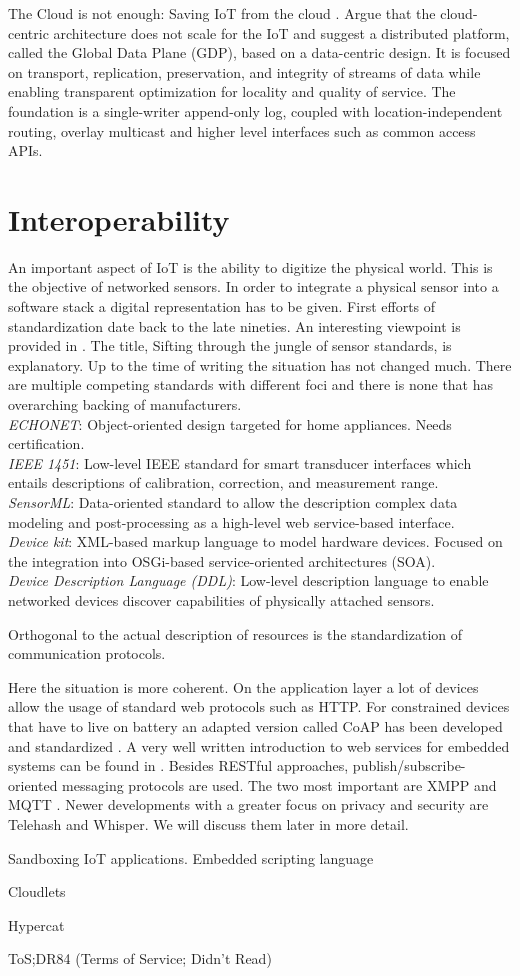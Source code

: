 The Cloud is not enough: Saving IoT from the cloud \cite{Zhang:2015}. Argue that the cloud-centric architecture does not scale for the IoT and suggest a distributed platform, called the Global Data Plane (GDP), based on a data-centric design. It is focused on transport, replication, preservation, and integrity of streams of data while enabling transparent optimization for locality and quality of service. The foundation is a single-writer append-only log, coupled with location-independent routing, overlay multicast and higher level interfaces such as common access APIs.


\section{Interoperability}

An important aspect of IoT is the ability to digitize the physical world. This is the objective of networked sensors. In order to integrate a physical sensor into a software stack a digital representation has to be given. First efforts of standardization date back to the late nineties. An interesting viewpoint is provided in \cite{Chen:2008}. The title, Sifting through the jungle of sensor standards, is explanatory. Up to the time of writing the situation has not changed much. There are multiple competing standards with different foci and there is none that has overarching backing of manufacturers. 
\\
\emph{ECHONET}: Object-oriented design targeted for home appliances. Needs certification.
\\
\emph{IEEE 1451}: Low-level IEEE standard for smart transducer interfaces which entails descriptions of calibration, correction, and measurement range.
\\
\emph{SensorML}: Data-oriented standard to allow the description complex data modeling and post-processing as a high-level web service-based interface.
\\
\emph{Device kit}: XML-based markup language to model hardware devices. Focused on the integration into OSGi-based service-oriented architectures (SOA).
\\
\emph{Device Description Language (DDL)}: Low-level description language to enable networked devices discover capabilities of physically attached sensors.

Orthogonal to the actual description of resources is the standardization of communication protocols. 

Here the situation is more coherent. 
On the application layer a lot of devices allow the usage of standard web protocols such as HTTP. For constrained devices that have to live on battery an adapted version called CoAP has been developed and standardized \cite{shelby2014constrained}. A very well written introduction to web services for embedded systems can be found in \cite{Shelby:2010}. Besides RESTful approaches, publish/subscribe-oriented messaging protocols are used. The two most important are XMPP \cite{saint2011extensible} and MQTT \cite{Hunkeler:2008}. 
Newer developments with a greater focus on privacy and security are Telehash and Whisper. We will discuss them later in more detail.   



Sandboxing IoT applications. Embedded scripting language \cite{Kovatsch:2012}


Cloudlets \cite{Verbelen:2012,Satyanarananan:2013}


Hypercat

 ToS;DR84 (Terms of Service; Didn’t Read)